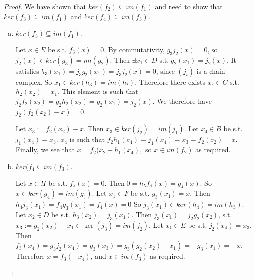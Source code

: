 \begin{proof}
We have shown that $ker(f_2)\subseteq im(f_1)$ and need to show that $ker(f_3)\subseteq im(f_1)$ and $ker(f_4)\subseteq im(f_3)$.

\begin{enumerate}[(a)]
\item $ker(f_3)\subseteq im(f_1)$.

Let $x\in E$ be s.t. $f_3(x)=0$. By commutativity, $g_3j_2(x)=0$, so $j_2(x)\in ker(g_3)=im(g_2)$. Then $\exists x_1\in D$ s.t. $g_2(x_1)=j_2(x)$. It satisfies $h_3(x_1)=j_3g_2(x_1)=j_3j_2(x)=0$, since $(j_i)$ is a chain complex. So $x_1\in ker(h_3)=im(h_2)$. Therefore there exists $x_2\in C$ s.t. $h_2(x_2)=x_1$. This element is such that $j_2f_2(x_2)=g_2h_2(x_2)=g_2(x_1)=j_2(x)$. We therefore have $j_2(f_2(x_2)-x)=0$.

Let $x_3:=f_2(x_2)-x$. Then $x_3\in ker(j_2)=im(j_1)$. Let $x_4\in B$ be s.t. $j_1(x_4)=x_3$. $x_4$ is such that $f_2h_1(x_4)=j_1(x_4)=x_3=f_2(x_2)-x$.
Finally, we see that $x=f_2(x_2-h_1(x_4),$ so $x\in im(f_2)$ as required.

\item $ker(f_4\subseteq im(f_3)$. 

Let $x\in H$ be s.t. $f_4(x)=0$. Then $0=h_5f_4(x)=g_4(x)$. So $x\in ker(g_4)=im(g_3)$. Let $x_1\in F$ be s.t. $g_3(x_1)=x$. Then $h_4j_3(x_1)=f_4g_3(x_1)=f_4(x)=0$
So $j_3(x_1)\in ker(h_4)=im(h_3)$. Let $x_2\in D$ be s.t. $h_3(x_2)=j_3(x_1)$. Then $j_3(x_1)=j_2g_2(x_2)$, s.t. $x_3:=g_2(x_2)-x_1\in \ker(j_3)=im(j_2)$. Let $x_4\in E$ be s.t. $j_2(x_4)=x_3$. Then $f_3(x_4)=g_3j_2(x_4)=g_3(x_3)=g_3(g_2(x_2)-x_1)=-g_3(x_1)=-x$. Therefore $x=f_3(-x_4)$, and $x\in im(f_3)$ as required.
\end{enumerate}
\end{proof}